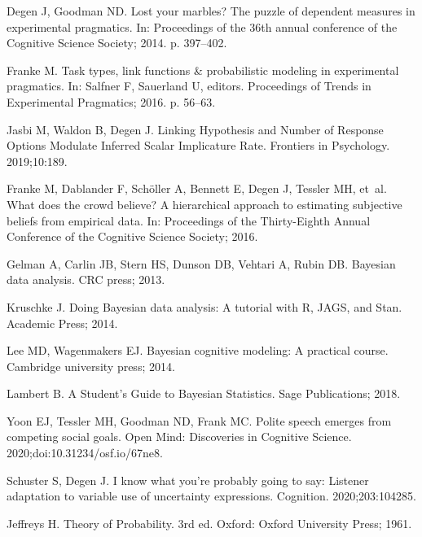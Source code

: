 \documentclass[10pt,letterpaper]{article}
\begin{document}
\begin{thebibliography}{10}
Degen J, Goodman ND.
\newblock Lost your marbles? The puzzle of dependent measures in experimental
  pragmatics.
\newblock In: Proceedings of the 36th annual conference of the {C}ognitive
  {S}cience {S}ociety; 2014. p. 397--402.

Franke M.
\newblock Task types, link functions \& probabilistic modeling in experimental
  pragmatics.
\newblock In: Salfner F, Sauerland U, editors. Proceedings of Trends in
  Experimental Pragmatics; 2016. p. 56--63.

Jasbi M, Waldon B, Degen J.
\newblock Linking Hypothesis and Number of Response Options Modulate Inferred
  Scalar Implicature Rate.
\newblock Frontiers in Psychology. 2019;10:189.

Franke M, Dablander F, Sch{\"o}ller A, Bennett E, Degen J, Tessler MH, et~al.
\newblock What does the crowd believe? A hierarchical approach to estimating
  subjective beliefs from empirical data.
\newblock In: Proceedings of the Thirty-Eighth Annual Conference of the
  {C}ognitive {S}cience {S}ociety; 2016.

Gelman A, Carlin JB, Stern HS, Dunson DB, Vehtari A, Rubin DB.
\newblock Bayesian data analysis.
\newblock CRC press; 2013.

Kruschke J.
\newblock Doing Bayesian data analysis: A tutorial with R, JAGS, and Stan.
\newblock Academic Press; 2014.

Lee MD, Wagenmakers EJ.
\newblock Bayesian cognitive modeling: A practical course.
\newblock Cambridge university press; 2014.

Lambert B.
\newblock A Student's Guide to Bayesian Statistics.
\newblock Sage Publications; 2018.

Yoon EJ, Tessler MH, Goodman ND, Frank MC.
\newblock Polite speech emerges from competing social goals.
\newblock Open Mind: Discoveries in Cognitive Science.
  2020;doi:{10.31234/osf.io/67ne8}.

Schuster S, Degen J.
\newblock I know what you're probably going to say: Listener adaptation to
  variable use of uncertainty expressions.
\newblock Cognition. 2020;203:104285.

Jeffreys H.
\newblock Theory of Probability.
\newblock 3rd ed. Oxford: Oxford University Press; 1961.


\end{thebibliography}
\end{document}
